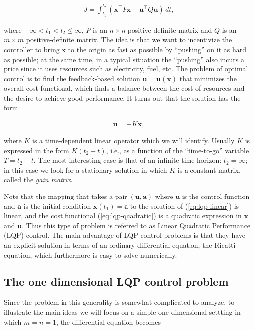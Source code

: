 \documentclass[11pt]{report}
\theoremstyle{plain}
\theoremstyle{definition}
\begin{document}
\begin{equation*} \tag{46}\label{eq:lqp-quadratic}
\begin{split}
J = \int_{t_1}^{t_2}
\left( \mathbf{x}^\top P \mathbf{x} + \mathbf{u}^\top Q \mathbf{u} \right)\, dt,
\end{split}
\end{equation*}

where $-\infty<t_1<t_2\le \infty$, $P$ is an
$n\times n$ positive-definite matrix and $Q$ is an
$m\times m$ positive-definite matrix. The idea is
that we want to incentivize the controller to bring
$\mathbf{x}$ to the origin as fast as possible by
``pushing'' on it as hard as possible; at the same
time, in a typical situation the ``pushing'' also
incurs a price since it uses resources such as
electricity, fuel, etc. The problem of optimal control
is to find the feedback-based solution
$\mathbf{u}=\mathbf{u}(\mathbf{x})$ that minimizes
the overall cost functional, which finds a balance
between the cost of resources and the desire to
achieve good performance. It turns out that the
solution has the form

\begin{equation*} \tag{47}\label{eq:lqp-gain-mat}
\begin{split}
\mathbf{u} = -K \mathbf{x},
\end{split}
\end{equation*}

where $K$ is a time-dependent linear operator which
we will identify. Usually $K$ is expressed in the
form $K(t_2-t)$, i.e., as a function of the
``time-to-go'' variable $T=t_2-t$. The most
interesting case is that of an infinite time horizon:
$t_2=\infty$; in this case we look for a stationary
solution in which $K$ is a constant matrix, called
the \emph{gain matrix}.

Note that the mapping that takes a pair
$(\mathbf{u},\mathbf{a})$ where $\mathbf{u}$ is the
control function and $\mathbf{a}$ is the initial
condition $\mathbf{x}(t_1)=\mathbf{a}$ to the
solution of (\ref{eq:lqp-linear}) is linear, and the cost
functional (\ref{eq:lqp-quadratic}) is a quadratic
expression in $\mathbf{x}$ and $\mathbf{u}$. Thus
this type of problem is referred to as Linear
Quadratic Performance (LQP) control. The main
advantage of LQP control problems is that they have an
explicit solution in terms of an ordinary differential
equation, the Ricatti equation, which furthermore is
easy to solve numerically.

\subsection{The one dimensional LQP control problem}
Since the problem in this generality is somewhat
complicated to analyze, to illustrate the main ideas
we will focus on a simple one-dimensional settting in
which $m=n=1$, the differential equation becomes
\end{document}
